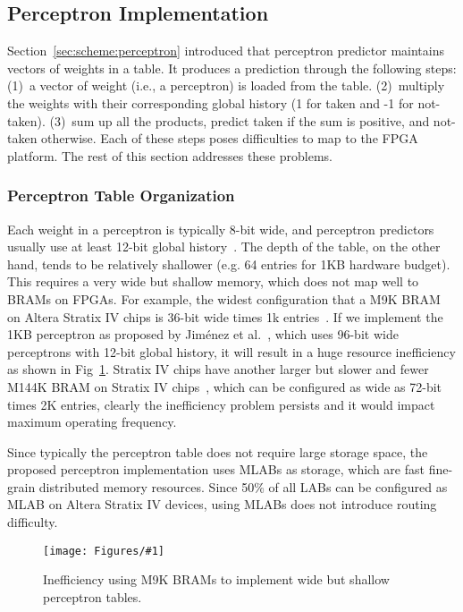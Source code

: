 \documentclass[conference]{IEEEtran}
\newcommand{\kfig}[4]{ %
        \begin{figure}[!t]
        \centering
        \texttt{[image: Figures/\#1]}
        \vspace{-1mm}
        \caption{#3}
        \label{#2}
        \end{figure}
}
\begin{document}
\subsection{Perceptron Implementation}
\label{sec:fpga:perceptron}

Section~\ref{sec:scheme:perceptron} introduced that perceptron predictor maintains vectors of weights in a table. It produces a prediction through the following steps: (1)~a vector of weight (i.e., a perceptron) is loaded from the table. (2)~multiply the weights with their corresponding global history (1 for taken and -1 for not-taken). (3)~sum up all the products, predict taken if the sum is positive, and not-taken otherwise. Each of these steps poses difficulties to map to the FPGA platform. The rest of this section addresses these problems.

\subsubsection{Perceptron Table Organization}
\label{sec:fpga:perceptron:table}
Each weight in a perceptron is typically 8-bit wide, and perceptron predictors usually use at least 12-bit global history~\cite{perceptron}. The depth of the table, on the other hand, tends to be relatively shallower (e.g. 64 entries for 1KB hardware budget). This requires a very wide but shallow memory, which does not map well to BRAMs on FPGAs. For example, the widest configuration that a M9K BRAM on Altera Stratix IV chips is 36-bit wide times 1k entries~\cite{StratixIVM9K}. If we implement the 1KB perceptron as proposed by Jim\'enez et al.~\cite{perceptron}, which uses 96-bit wide perceptrons with 12-bit global history, it will result in a huge resource inefficiency as shown in Fig~\ref{fig:perceptronTable}. Stratix IV chips have another larger but slower and fewer M144K BRAM on Stratix IV chips~\cite{StratixIVM9K}, which can be configured as wide as 72-bit times 2K entries, clearly the inefficiency problem persists and it would impact maximum operating frequency.

Since typically the perceptron table does not require large storage space, the proposed perceptron implementation uses MLABs as storage, which are fast fine-grain distributed memory resources. Since 50\% of all LABs can be configured as MLAB on Altera Stratix IV devices, using MLABs does not introduce routing difficulty.
\kfig{perceptronTable.pdf}{fig:perceptronTable}{Inefficiency using M9K BRAMs to implement wide but shallow perceptron tables.}{angle = 0, trim = 1in 2in 3.4in 0.5in, clip, width=0.3\textwidth}
\end{document}
